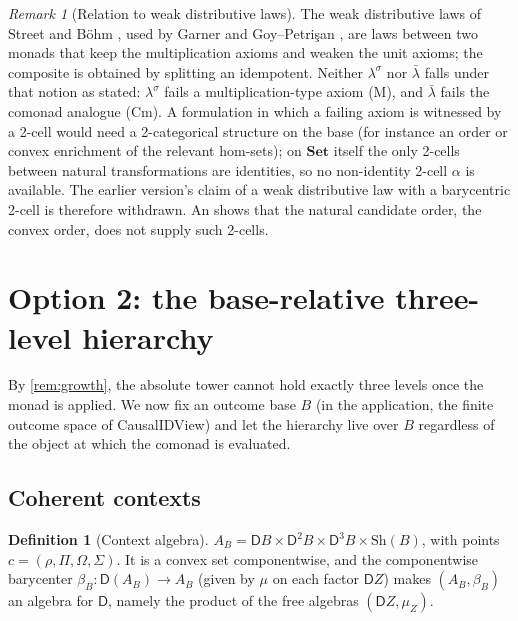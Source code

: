 \documentclass[11pt]{article}
\theoremstyle{definition}
\newtheorem{definition}[theorem]{Definition}
\theoremstyle{remark}
\newtheorem{remark}[theorem]{Remark}
\newcommand{\D}{\mathsf{D}}
\newcommand{\Set}{\mathbf{Set}}
\newcommand{\Sh}{\mathrm{Sh}}
\newcommand{\lb}{\bar\lambda}
\newcommand{\ls}{\lambda^{\sigma}}
\begin{document}
\begin{remark}[Relation to weak distributive laws]\label{rem:weak}
The weak distributive laws of Street and B\"ohm \cite{Street2009,Bohm2010,BohmLackStreet2011}, used by
Garner \cite{Garner2020} and Goy--Petri\c{s}an \cite{GoyPetrisan2020}, are laws between two monads
that keep the multiplication axioms and weaken the unit axioms; the composite is obtained by
splitting an idempotent. Neither $\ls$ nor $\lb$ falls under that notion as stated: $\ls$ fails a
multiplication-type axiom (M), and $\lb$ fails the comonad analogue (Cm). A formulation in which a
failing axiom is witnessed by a 2-cell would need a 2-categorical structure on the base (for instance
an order or convex enrichment of the relevant hom-sets); on $\Set$ itself the only 2-cells between
natural transformations are identities, so no non-identity 2-cell $\alpha$ is available. The earlier
version's claim of a weak distributive law with a barycentric 2-cell is therefore withdrawn. An
 shows that the natural candidate order, the convex order, does not supply such 2-cells.
\end{remark}

\section{Option 2: the base-relative three-level hierarchy}\label{sec:relative}

By \cref{rem:growth}, the absolute tower cannot hold exactly three levels once the monad is applied.
We now fix an outcome base $B$ (in the application, the finite outcome space of CausalIDView) and let
the hierarchy live over $B$ regardless of the object at which the comonad is evaluated.

\subsection{Coherent contexts}

\begin{definition}[Context algebra]
$A_B=\D B\times\D^2B\times\D^3B\times\Sh(B)$, with points $c=(\rho,\Pi,\Omega,\Sigma)$. It is a convex
set componentwise, and the componentwise barycenter $\beta_B\colon\D(A_B)\to A_B$ (given by $\mu$ on
each factor $\D Z$) makes $(A_B,\beta_B)$ an algebra for $\D$, namely the product of the free algebras
$(\D Z,\mu_Z)$.
\end{definition}
\end{document}
